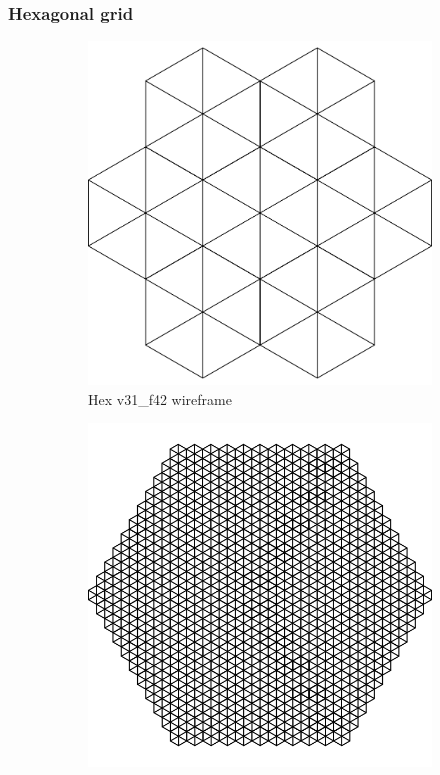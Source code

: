 \subsubsection{Hexagonal grid}
\begin{figure}[ht]
\ffigbox
	{\begin{subfigure}[b]{0.48\linewidth}
		\includegraphics[width=1.0\linewidth,height=0.3\textheight,keepaspectratio]{data/synthetic_meshes/hexagonal_tessellation_Dirac_delta_1_v31_f42_wireframe.png}
		\caption{Hex v31\_f42 wireframe}\label{fig:hex.a}
	\end{subfigure}
	\begin{subfigure}[b]{0.48\linewidth}
		\includegraphics[width=1.0\linewidth,height=0.3\textheight,keepaspectratio]{data/synthetic_meshes/hexagonal_tessellation_Dirac_delta_10_v1057_f1986_wireframe.png}

\end{subfigure}}
\end{figure}
